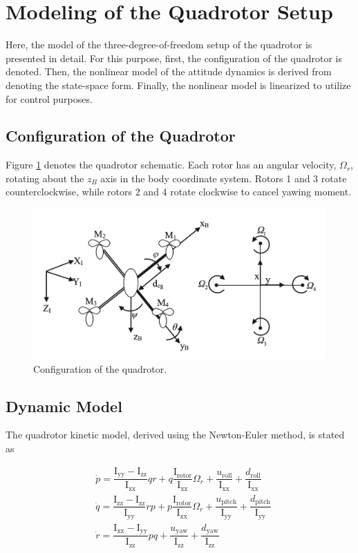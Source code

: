 \documentclass[3p,times]{elsarticle}
\begin{document}
\section{Modeling of the Quadrotor Setup}
Here, the model of the three-degree-of-freedom setup of the quadrotor is presented in detail. For this purpose, first, the configuration of the quadrotor is denoted. Then, the nonlinear model of the attitude dynamics is derived from denoting the state-space form. Finally, the nonlinear model is linearized to utilize for control purposes.
\subsection{Configuration of the Quadrotor}
Figure \ref{fig:schematic} denotes the quadrotor schematic. Each rotor has an angular velocity, $\Omega_r$, rotating about the $z_B$ axis in the body coordinate system. Rotors 1 and 3 rotate counterclockwise, while rotors 2 and 4 rotate clockwise to cancel yawing moment.

\begin{figure}[!h]
    \centering
    \includegraphics[width=12cm]{../Figure/schematic.png}
    \caption{Configuration of the quadrotor.}
    \label{fig:schematic}
\end{figure}

\subsection{Dynamic Model}
The quadrotor kinetic model, derived using the Newton-Euler method, is stated as \cite{4399042, article_Bouabdallah}



\begin{align}
    &\dot p = \dfrac{\mathrm{I}_{\text{yy}} - \mathrm{I}_{\text{zz}}}{\mathrm{I}_{\text{xx}}} qr + q \dfrac{\mathrm{I}_{\text{rotor}}}{\mathrm{I}_{\text{xx}}}\Omega_r + \dfrac{u_{\text{roll}}}{\mathrm{I}_{\text{xx}}} + \dfrac{d_{\text{roll}}}{\mathrm{I}_{\text{xx}}}
    \\
&\dot q = \dfrac{\mathrm{I}_{\text{zz}} - \mathrm{I}_{\text{zz}}}{\mathrm{I}_{\text{yy}}} rp + p \dfrac{\mathrm{I}_{\text{rotor}}}{\mathrm{I}_{\text{xx}}}\Omega_r + \dfrac{u_{\text{pitch}}}{\mathrm{I}_{\text{yy}}} + \dfrac{d_{\text{pitch}}}{\mathrm{I}_{\text{yy}}}
\\
&\dot r = \dfrac{\mathrm{I}_{\text{xx}} - \mathrm{I}_{\text{yy}}}{\mathrm{I}_{\text{zz}}} pq  +  \dfrac{u_{\text{yaw}}}{\mathrm{I}_{\text{zz}}} + \dfrac{d_{\text{yaw}}}{\mathrm{I}_{\text{zz}}}
\end{align}
\end{document}
